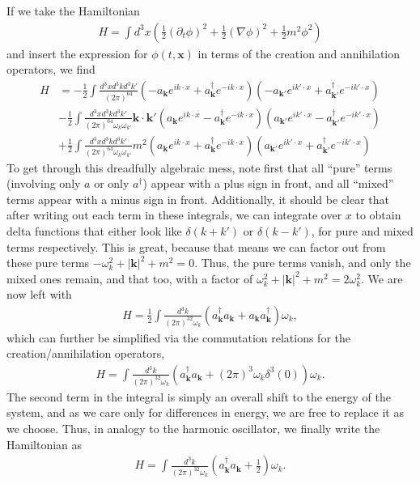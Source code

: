 \documentclass{mathnotes}
\begin{document}
If we take the Hamiltonian
\begin{align*}
    H=\int d^3x \left( \frac{1}{2}(\partial_t\phi)^2+\frac{1}{2}(\nabla\phi)^2+\frac{1}{2}m^2\phi^2 \right)
\end{align*}
and insert the expression for $\phi(t, \mathbf{x})$ in terms of the creation and annihilation operators, we find
\begin{align*}
    H&=-\frac{1}{2}\int \frac{d^3xd^3kd^3k'}{(2\pi)^64}\left(-a_\mathbf{k}e^{ik\cdot x}+a^\dagger_\mathbf{k}e^{-ik\cdot x} \right)\left(-a_\mathbf{k'}e^{ik'\cdot x}+a^\dagger_\mathbf{k'}e^{-ik'\cdot x} \right)\\
    &-\frac{1}{2}\int \frac{d^3xd^3kd^3k'}{(2\pi)^64\omega_k\omega_{k'}}\mathbf{k}\cdot\mathbf{k}'\left(a_\mathbf{k}e^{ik\cdot x}-a^\dagger_\mathbf{k}e^{-ik\cdot x} \right)\left(a_\mathbf{k'}e^{ik'\cdot x}-a^\dagger_\mathbf{k'}e^{-ik'\cdot x} \right)\\
    &+\frac{1}{2}\int \frac{d^3xd^3kd^3k'}{(2\pi)^64\omega_k\omega_{k'}}m^2\left(a_\mathbf{k}e^{ik\cdot x}+a^\dagger_\mathbf{k}e^{-ik\cdot x} \right)\left(a_\mathbf{k'}e^{ik'\cdot x}+a^\dagger_\mathbf{k'}e^{-ik'\cdot x} \right)
\end{align*}
To get through this dreadfully algebraic mess, note first that all ``pure'' terms (involving only $a$ or only $a^\dagger$) appear with a plus sign in front, and all ``mixed'' terms appear with
a minus sign in front. Additionally, it should be clear that after writing out each term in these integrals, we can integrate over $x$ to obtain delta functions that either look like
$\delta(k+k')$ or $\delta(k-k')$, for pure and mixed terms respectively. This is great, because that means we can factor out from these pure terms $-\omega_k^2+|\mathbf{k}|^2+m^2=0$. Thus,
the pure terms vanish, and only the mixed ones remain, and that too, with a factor of $\omega_k^2+|\mathbf{k}|^2+m^2=2\omega_k^2$. We are now left with
\begin{align*}
    H=\frac{1}{2}\int \frac{d^3k}{(2\pi)^32\omega_k}\left( a^\dagger_\mathbf{k}a_\mathbf{k} +a_\mathbf{k}a^\dagger_\mathbf{k} \right)\omega_k,
\end{align*}
which can further be simplified via the commutation relations for the creation/annihilation operators,
\begin{align*}
    H=\int \frac{d^3k}{(2\pi)^32\omega_k}\left( a^\dagger_\mathbf{k}a_\mathbf{k} +(2\pi)^3\omega_k\delta^3(0)\right)\omega_k.
\end{align*}
The second term in the integral is simply an overall shift to the energy of the system, and as we care only for differences in energy, we are free to replace it as we choose. Thus,
in analogy to the harmonic oscillator, we finally write the Hamiltonian as
\begin{align*}
    H=\int \frac{d^3k}{(2\pi)^32\omega_k}\left( a^\dagger_\mathbf{k}a_\mathbf{k} +\frac{1}{2}\right)\omega_k.
\end{align*}
\end{document}

